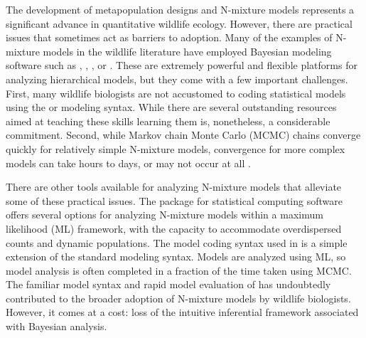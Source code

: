 \documentclass[codesnippet]{jss}
\begin{document}
The development of metapopulation designs and N-mixture models represents a significant advance in quantitative wildlife ecology. However, there are practical issues that sometimes act as barriers to adoption. Many of the examples of N-mixture models in the wildlife literature have employed Bayesian modeling software such as , , , or   \citep{plummer2003jags,Lunn_Jackson_Best_Thomas_Spiegelhalter_2012,Carpenter_Gelman_Hoffman_Lee_et_al_2017}. These are extremely powerful and flexible platforms for analyzing hierarchical models, but they come with a few important challenges. First, many wildlife biologists are not accustomed to coding statistical models using the  or  modeling syntax. While there are several outstanding resources aimed at teaching these skills  \citep{Royle_Dorazio_2008, Kery_2010, Kery_Schaub_2011, Kery_Royle_2015, Korner-Nievergelt_Roth_et_al_2015} learning them is, nonetheless, a considerable commitment. Second, while Markov chain Monte Carlo (MCMC) chains converge quickly for relatively simple N-mixture models, convergence for more complex models can take hours to days, or may not occur at all \citep{Kery_Schaub_2011}.

There are other tools available for analyzing N-mixture models that 
alleviate some of these practical issues. The  package 
\citep{Fiske_Chandler_2011} for  statistical computing software 
\citep{R_Core_Team_2016} offers several options for analyzing N-mixture 
models within a maximum likelihood (ML) framework, with the capacity to 
accommodate overdispersed counts and dynamic populations. The model coding 
syntax used in  is a simple extension of the standard 
 modeling syntax. Models are analyzed using ML, so model 
analysis is often completed in a fraction of the time taken using MCMC. The 
familiar model syntax and rapid model evaluation of  has 
undoubtedly contributed to the broader adoption of N-mixture models by 
wildlife biologists. However, it comes at a cost: loss of the intuitive 
inferential framework associated with Bayesian analysis.
\end{document}
